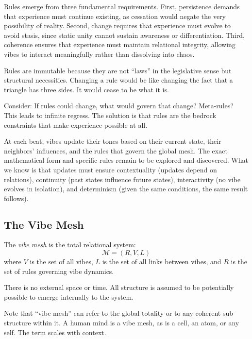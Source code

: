 \begin{axiom}
Rules emerge from three fundamental requirements. First, persistence demands that experience must continue existing, as cessation would negate the very possibility of reality. Second, change requires that experience must evolve to avoid stasis, since static unity cannot sustain awareness or differentiation. Third, coherence ensures that experience must maintain relational integrity, allowing vibes to interact meaningfully rather than dissolving into chaos.
\end{axiom}

Rules are immutable because they are not ``laws'' in the legislative sense but structural necessities. Changing a rule would be like changing the fact that a triangle has three sides. It would cease to be what it is.

Consider: If rules could change, what would govern that change? Meta-rules? This leads to infinite regress. The solution is that rules are the bedrock constraints that make experience possible at all.

At each beat, vibes update their tones based on their current state, their neighbors' influences, and the rules that govern the global mesh. The exact mathematical form and specific rules remain to be explored and discovered. What we know is that updates must ensure contextuality (updates depend on relations), continuity (past states influence future states), interactivity (no vibe evolves in isolation), and determinism (given the same conditions, the same result follows).

\subsection{The Vibe Mesh}

\begin{definition}
The \emph{vibe mesh} is the total relational system:
\[
\mathcal{M} = (R, V, L)
\]
where $V$ is the set of all vibes, $L$ is the set of all links between vibes, and $R$ is the set of rules governing vibe dynamics.
\end{definition}

There is no external space or time. All structure is assumed to be potentially possible to emerge internally to the system.

Note that ``vibe mesh'' can refer to the global totality or to any coherent sub-structure within it. A human mind is a vibe mesh, as is a cell, an atom, or any self. The term scales with context.

